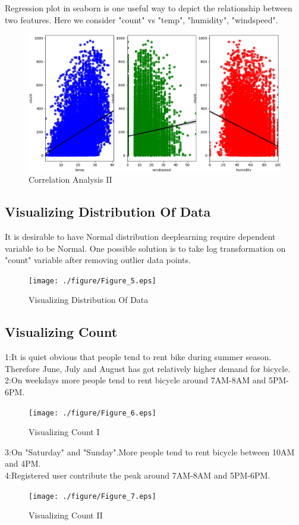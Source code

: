 \documentclass{amsart}
\begin{document}
Regression plot in seaborn is one useful way to depict the relationship between two features. Here we consider "count" vs "temp", "humidity", "windspeed".
\begin{figure}[htbp]
	\includegraphics[scale=0.5]{./figure/Figure_4.eps}
	\caption{Correlation Analysis II}
\end{figure}

\subsection{Visualizing Distribution Of Data}
It is desirable to have Normal distribution deeplearning require dependent variable to be Normal. One possible solution is to take log transformation on "count" variable after removing outlier data points.
\begin{figure}[htbp]
	\texttt{[image: ./figure/Figure\_5.eps]}
	\caption{Visualizing Distribution Of Data}
\end{figure}

\subsection{Visualizing Count}
1:It is quiet obvious that people tend to rent bike during summer season. Therefore June, July and August has got relatively higher demand for bicycle.\\
2:On weekdays more people tend to rent bicycle around 7AM-8AM and 5PM-6PM. 
\begin{figure}[htbp]
	\texttt{[image: ./figure/Figure\_6.eps]}
	\caption{Visualizing Count I}
\end{figure}
3:On "Saturday" and "Sunday".More people tend to rent bicycle between 10AM and 4PM.\\
4:Registered user contribute the peak around 7AM-8AM and 5PM-6PM.
\begin{figure}[htbp]
	\texttt{[image: ./figure/Figure\_7.eps]}
	\caption{Visualizing Count II}
\end{figure}
\end{document}
